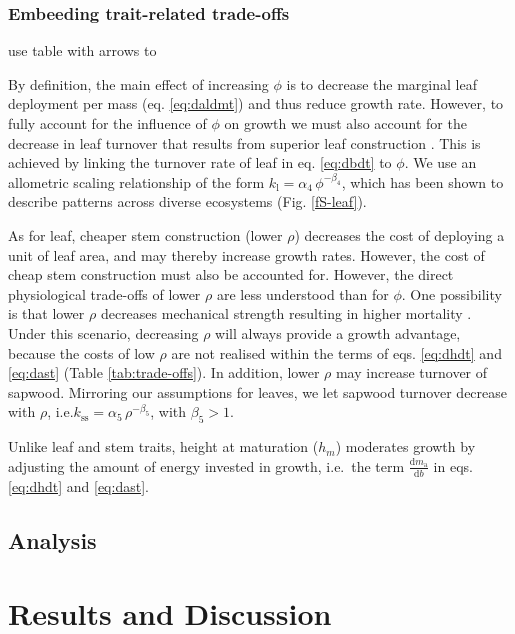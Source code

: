 \documentclass[12pt, a4paper]{article}
\begin{document}
\subsubsection{Embeeding trait-related trade-offs}

use table with arrows to



By definition, the main effect of increasing $\phi$ is to decrease the
marginal leaf deployment per mass (eq. \ref{eq:daldmt}) and thus reduce
growth rate. However, to fully account for the influence of $\phi$ on
growth we must also account for the decrease in leaf turnover that
results from superior leaf construction \citep{wright_world-2004}.
This is achieved by linking the turnover rate of leaf in eq.
\ref{eq:dbdt} to $\phi$. We use an allometric scaling relationship of
the form $k_\textrm{l}=\alpha_4 \, \phi^{-\beta_4}$, which has been
shown to describe patterns across diverse
ecosystems \citep{wright_world-2004} (Fig. \ref{fS-leaf}).

As for leaf, cheaper stem construction (lower $\rho$) decreases the
cost of deploying a unit of leaf area, and may thereby increase growth
rates. However, the cost of cheap stem construction must also be
accounted for. However, the direct physiological trade-offs of lower
$\rho$ are less understood than for $\phi$. One possibility is that
lower $\rho$ decreases mechanical strength resulting in higher
mortality \citep{chave-2009,wright-2010}. Under
this scenario, decreasing $\rho$ will always provide a growth
advantage, because the costs of low $\rho$ are not realised within the
terms of eqs. \ref{eq:dhdt} and \ref{eq:dast} (Table
\ref{tab:trade-offs}). In addition, lower $\rho$ may increase turnover
of sapwood. Mirroring our assumptions for leaves, we let sapwood
turnover decrease with $\rho$,
i.e.$k_\textrm{ss}=\alpha_5 \, \rho^{-\beta_5}$, with $\beta_5 > 1$.

Unlike leaf and stem traits, height at maturation ($h_m$) moderates
growth by adjusting the amount of energy invested in growth, i.e.~the
term $\frac{\textrm{d}m_\textrm{a}}{\textrm{d}b}$ in eqs.
\ref{eq:dhdt} and \ref{eq:dast}.

\subsection{Analysis}\label{analysis}



\newpage
\section{Results and Discussion}\label{results}
\end{document}
